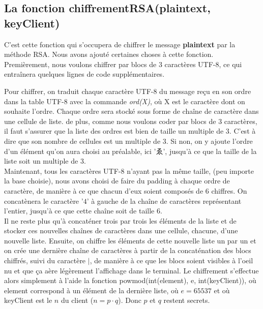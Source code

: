 \documentclass[12pt]{article}
\theoremstyle{definition}
\begin{document}
	 \subsection{La fonction chiffrementRSA(plaintext, keyClient)}
C'est cette fonction qui s'occupera de chiffrer le message \textbf{plaintext} par la méthode RSA. Nous avons ajouté certaines choses à cette fonction. Premièrement, nous voulons chiffrer par blocs de $3$ caractères UTF-8, ce qui entraînera quelques lignes de code supplémentaires.\\
\begin{CJK}{UTF8}{min}
Pour chiffrer, on traduit chaque caractère UTF-8 du message reçu en son ordre dans la table UTF-8 avec la commande \textit{ord(X)}, où X est le caractère dont on souhaite l'ordre. Chaque ordre sera stocké sous forme de chaîne de caractère dans une cellule de liste. de plus, comme nous voulons coder par blocs de $3$ caractères, il faut s'assurer que la liste des ordres est bien de taille un multiple de $3$. C'est à dire que son nombre de cellules est un multiple de $3$. Si non, on y ajoute l'ordre d'un élément qu'on aura choisi au préalable, ici 'ゑ', jusqu'à ce que la taille de la liste soit un multiple de $3$.\\
Maintenant, tous les caractères UTF-8 n'ayant pas la même taille, (peu importe la base choisie), nous avons choisi de faire du padding à chaque ordre de caractère, de manière à ce que chacun d'eux soient composés de $6$ chiffres. On concatènera le caractère '$4$' à gauche de la chaîne de caractères représentant l'entier, jusqu'à ce que cette chaîne soit de taille $6$.\\
Il ne reste plus qu'à concaténer trois par trois les éléments de la liste et de stocker ces nouvelles chaînes de caractères dans une cellule, chacune, d'une nouvelle liste. Ensuite, on chiffre les éléments de cette nouvelle liste un par un et on crée une dernière chaîne de caractères à partir de la concaténation des blocs chiffrés, suivi du caractère $\mid$, de manière à ce que les blocs soient visibles à l'oeil nu et que ça aère légèrement l'affichage dans le terminal. Le chiffrement s'effectue alors simplement à l'aide la fonction \textsf{powmod(int(element), e, int(keyClient))}, où element correspond à un élément de la dernière liste, où $e=65537$ et où keyClient est le $n$ du client ($n=p \cdot q$). Donc $p$ et $q$ restent secrets.

\end{CJK}
\end{document}
